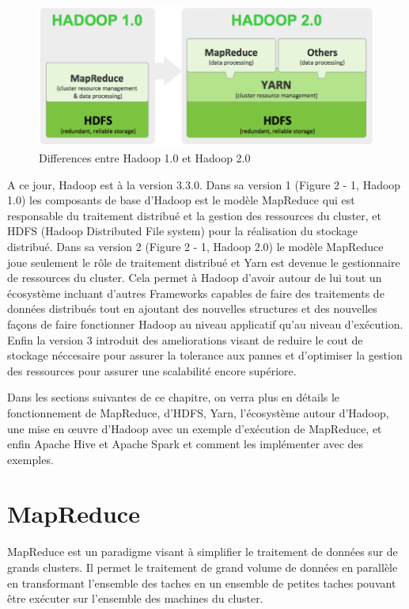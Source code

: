 \documentclass[12pt,french]{book}
\begin{document}
	\newpage
	\begin{figure}[t]
		\centering
		\includegraphics[width=\linewidth]{hadoop1vshadoop2}
		\caption[Differences entre Hadoop 1.0 et Hadoop 2.0]{Differences entre Hadoop 1.0 et Hadoop 2.0\footnotemark}
	\end{figure}


A ce jour, Hadoop est à la version 3.3.0.
Dans sa version 1 (Figure 2 - 1, Hadoop 1.0) les composants de base d’Hadoop est le modèle MapReduce qui est responsable du traitement distribué et la gestion des ressources du cluster, et HDFS (Hadoop Distributed File system) pour la réalisation du stockage distribué.
Dans sa version 2 (Figure 2 - 1, Hadoop 2.0) le modèle MapReduce joue seulement le rôle de traitement distribué et Yarn est devenue le gestionnaire de ressources du cluster.
Cela permet à Hadoop d'avoir autour de lui tout un écosystème incluant d’autres Frameworks capables de faire des traitements de données distribués tout en ajoutant des nouvelles structures et des nouvelles façons de faire fonctionner Hadoop au niveau applicatif qu’au niveau d’exécution.
Enfin la version 3 introduit des ameliorations visant de reduire le cout de stockage néccesaire pour assurer la tolerance aux pannes et d'optimiser la gestion des ressources pour assurer une scalabilité encore supériore.

Dans les sections suivantes de ce chapitre, on verra plus en détails le fonctionnement de MapReduce, d’HDFS, Yarn, l’écosystème autour d’Hadoop, une mise en œuvre d’Hadoop avec un exemple d’exécution de MapReduce, et enfin Apache Hive et Apache Spark et comment les implémenter avec des exemples.

	\section{MapReduce}
MapReduce est un paradigme visant à simplifier le traitement de données sur de grands clusters. Il permet le traitement de grand volume de données en parallèle en transformant l’ensemble des taches en un ensemble de petites taches pouvant être exécuter sur l’ensemble des machines du cluster. 
\end{document}
